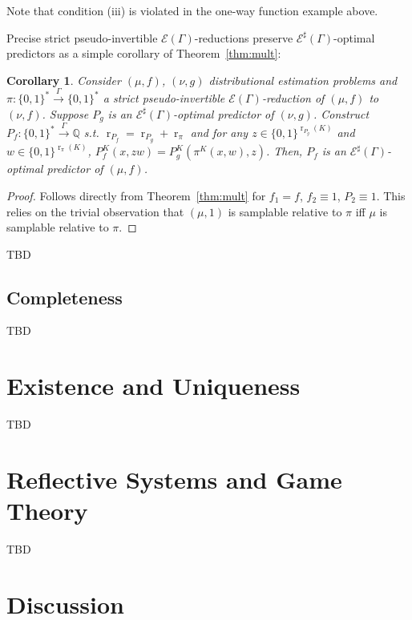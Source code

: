 \documentclass{article}
\numberwithin{equation}{section}
\theoremstyle{definition}
\theoremstyle{plain}
\newtheorem{corollary}{Corollary}[section]
\newcommand{\Bool}{\{0,1\}}
\newcommand{\Words}{{\Bool^*}}
\DeclareMathOperator{\R}{r}
\newcommand{\Rats}{\mathbb{Q}}
\newcommand{\Fall}{\mathcal{E}}
\newcommand{\EG}{\Fall(\Gamma)}
\newcommand{\ESG}{\Fall^\sharp(\Gamma)}
\newcommand{\BoolR}[1]{\Bool^{\R_{#1}(K)}}
\newcommand{\Scheme}{\xrightarrow{\Gamma}}
\begin{document}
Note that condition (iii) is violated in the one-way function example above.

Precise strict pseudo-invertible $\EG$-reductions preserve $\ESG$-optimal predictors as a simple corollary of Theorem~\ref{thm:mult}:

\begin{samepage}
\begin{corollary}

Consider $(\mu,f)$, $(\nu,g)$ distributional estimation problems and $\pi: \Words \Scheme \Words$ a strict pseudo-invertible $\EG$-reduction of $(\mu, f)$ to $(\nu, f)$. Suppose $P_g$ is an $\ESG$-optimal predictor of $(\nu, g)$. Construct $P_f: \Words \Scheme \Rats$ s.t. $\R_{P_f} = \R_{P_g} + \R_\pi$ and for any $z \in \BoolR{P_g}$ and $w \in \BoolR{\pi}$, $P_f^K(x,zw)=P_g^K(\pi^K(x,w),z)$. Then, $P_f$ is an $\ESG$-optimal predictor of $(\mu, f)$.

\end{corollary}
\end{samepage}

\begin{proof}

Follows directly from Theorem~\ref{thm:mult} for $f_1 = f$, ${f_2 \equiv 1}$, $P_2 \equiv 1$. This relies on the trivial observation that $(\mu, 1)$ is samplable relative to $\pi$ iff $\mu$ is samplable relative to $\pi$.
%
\end{proof}

TBD

\subsection{Completeness}

TBD

\section{Existence and Uniqueness}
\label{sec:e_and_u}

TBD

\section{Reflective Systems and Game Theory}
\label{sec:reflective}

TBD

\section{Discussion}
\label{sec:discussion}
\end{document}
